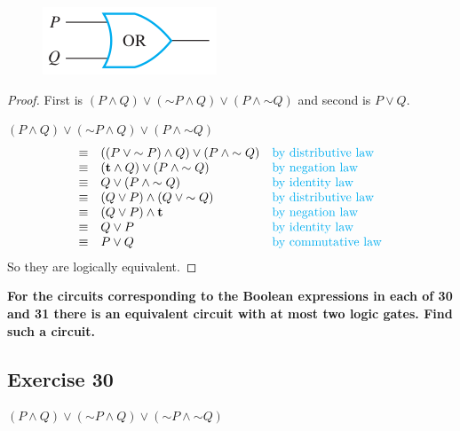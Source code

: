 \documentclass[14pt]{extarticle}
\begin{document}
\begin{figure}[ht!] \centering
\includegraphics[scale=0.5]{../images/2.4.29.b.png} \end{figure}

\begin{proof} First is $(P \wedge Q) \vee ({\sim P} \wedge Q) \vee (P \wedge
{\sim Q})$ and second is $P \vee Q$.

$(P \wedge Q) \vee ({\sim P} \wedge Q) \vee (P \wedge {\sim Q})$ $$
\begin{array}{cll} \equiv & ((P \vee {\sim P}) \wedge Q) \vee (P \wedge {\sim
Q}) & \text{\color{cyan}by distributive law} \\ \equiv & ({\bf t} \wedge Q) \vee
(P \wedge {\sim Q}) & \text{\color{cyan}by negation law} \\ \equiv & Q \vee (P
\wedge {\sim Q}) & \text{\color{cyan}by identity law} \\ \equiv & (Q \vee P)
\wedge (Q \vee {\sim Q}) & \text{\color{cyan}by distributive law} \\ \equiv & (Q
\vee P) \wedge {\bf t} & \text{\color{cyan}by negation law} \\ \equiv & Q \vee P &
\text{\color{cyan}by identity law} \\ \equiv & P \vee Q & \text{\color{cyan}by
commutative law} \\ \end{array} $$ So they are logically equivalent. \end{proof}

{\bf \color{cyan} For the circuits corresponding to the Boolean expressions in
each of 30 and 31 there is an equivalent circuit with at most two logic gates.
Find such a circuit.}

\subsection{Exercise 30} $(P \wedge Q) \vee ({\sim P} \wedge Q) \vee ({\sim P}
\wedge {\sim Q})$
\end{document}
